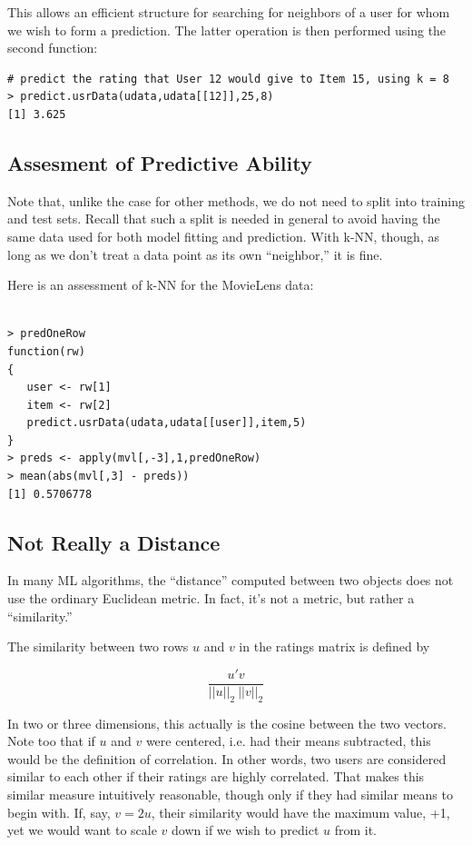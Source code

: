 This allows an efficient structure for searching for neighbors of a user
for whom we wish to form a prediction.  The latter operation is then
performed using the second function:

\begin{lstlisting}
# predict the rating that User 12 would give to Item 15, using k = 8
> predict.usrData(udata,udata[[12]],25,8)
[1] 3.625
\end{lstlisting}

\subsection{Assesment of Predictive Ability}

Note that, unlike the case for other methods, we do not need to split
into training and test sets.  Recall that such a split is needed in
general to avoid having the same data used for both model fitting and
prediction.  With k-NN, though, as long as we don't treat a data point
as its own ``neighbor,'' it is fine.

Here is an assessment of k-NN for the MovieLens data:

\begin{lstlisting}

> predOneRow
function(rw)
{
   user <- rw[1]
   item <- rw[2]
   predict.usrData(udata,udata[[user]],item,5)
}
> preds <- apply(mvl[,-3],1,predOneRow)
> mean(abs(mvl[,3] - preds))
[1] 0.5706778

\end{lstlisting}


\subsection{Not Really a Distance}

In many ML algorithms, the ``distance'' computed between two objects 
does not use the ordinary Euclidean metric.  In fact, it's not a metric,
but rather a ``similarity.''

The similarity between two rows $u$ and $v$ in the ratings matrix
is defined by

\begin{equation}
\frac{u'v}{||u||_2 ~ ||v||_2}
\end{equation}

In two or three dimensions, this actually is the cosine between the two
vectors.  Note too that if $u$ and $v$ were centered, i.e. had their
means subtracted, this would be the definition of correlation.  In other
words, two users are considered similar to each other if their ratings
are highly correlated.  That makes this similar measure intuitively
reasonable, though only if they had similar means to begin with.  If,
say, $v = 2u$, their similarity would have the maximum value, +1, yet we
would want to scale $v$ down if we wish to predict $u$ from it.

